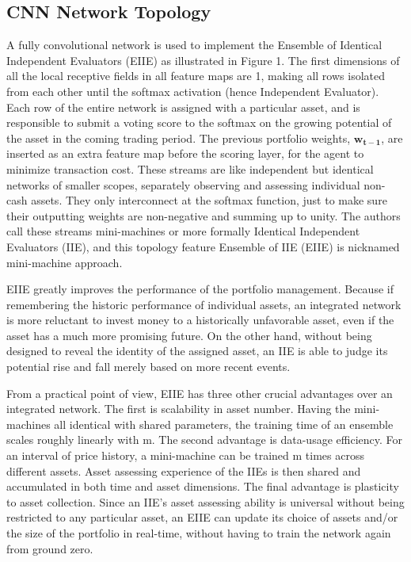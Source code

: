 \documentclass[journal,onecolumn]{IEEEtran}
\newcommand{\vc}[1]{\mathbf{#1}}
\begin{document}
\subsection{CNN Network Topology}
A fully convolutional network is used to implement the Ensemble of Identical Independent Evaluators (EIIE) as illustrated in Figure 1. The first dimensions of all the local receptive fields in all feature maps are 1, making all rows isolated from each other until the softmax activation (hence Independent Evaluator). Each row of the entire network is assigned with a particular asset, and is responsible to submit a voting score to the softmax on the growing potential of the asset in the coming trading period. The previous portfolio weights, $\vc{w_{t-1}}$, are inserted as an extra feature map before the scoring layer, for the agent to minimize transaction cost. These streams are like independent but identical networks of smaller scopes, separately observing and assessing individual non-cash assets. They only interconnect at the softmax function, just to make sure their outputting weights are non-negative and summing up to unity. The authors call these streams mini-machines or more formally Identical Independent Evaluators (IIE), and this topology feature Ensemble of IIE (EIIE) is nicknamed mini-machine approach. 

EIIE greatly improves the performance of the portfolio management. Because if remembering the historic performance of individual assets, an integrated network is more reluctant to invest money to a historically unfavorable asset, even if the asset has a much more promising future. On the other hand, without being designed to reveal the identity of the assigned asset, an IIE is able to judge its potential rise and fall merely based on more recent events.

From a practical point of view, EIIE has three other crucial advantages over an integrated network. The first is scalability in asset number. Having the mini-machines all identical with shared parameters, the training time of an ensemble scales roughly linearly with m. The second advantage is data-usage efficiency. For an interval of price history, a mini-machine can be trained m times across different assets. Asset assessing experience of the IIEs is then shared and accumulated in both time and asset dimensions. The final advantage is plasticity to asset collection. Since an IIE’s asset assessing ability is universal without being restricted to any particular asset, an EIIE can update its choice of assets and/or the size of the portfolio in real-time, without having to train the network again from ground zero.
\end{document}
